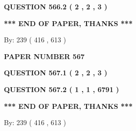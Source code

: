 \documentclass[12pt]{article}
\begin{document}
  
  
\vspace{0.2in}
  
{\textbf{\Large{QUESTION
566.2 
 ( 2 , 2 , 3 )
}}}
  
  
   
   
 \vspace{0.2in}
 
   
   
   
   
\vspace{1.0in} 
{\textbf{\large{ *** END OF PAPER, THANKS *** }}} 
   
   
\hspace{1.0in} By: 
 239 ( 416 ,  613 )
   
   
   
   
\newpage 
\setcounter{page}{ 
   567001 } 
   
   
   
   
 {\textbf{ \Large{ PAPER NUMBER  567  }}}
   
   
\vspace{0.2in}
   
   
   
   
   
   
 \vspace{0.2in}
 
 
 
 
   
   
  
\vspace{0.2in}
  
{\textbf{\Large{QUESTION
567.1 
 ( 2 , 2 , 3 )
}}}
  
  
  
\vspace{0.2in}
  
{\textbf{\Large{QUESTION
567.2 
 ( 1 , 1 , 6791 )
}}}
  
  
   
   
 \vspace{0.2in}
 
   
   
   
   
\vspace{1.0in} 
{\textbf{\large{ *** END OF PAPER, THANKS *** }}} 
   
   
\hspace{1.0in} By: 
 239 ( 416 ,  613 )
   
   
   
\end{document}
